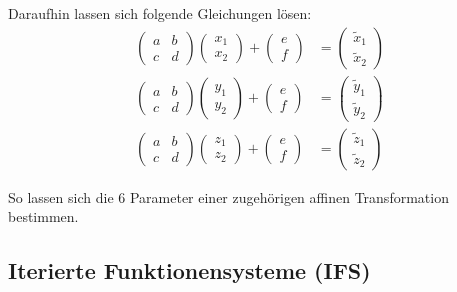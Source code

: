 \documentclass[afourpaper]{latex-classes/handout}
\begin{document}
Daraufhin lassen sich folgende Gleichungen lösen:
\begin{align*}
  \begin{pmatrix}
    a & b \\ c & d
  \end{pmatrix} \begin{pmatrix}
    x_1 \\ x_2
  \end{pmatrix} + \begin{pmatrix}
    e \\ f
  \end{pmatrix} &= \begin{pmatrix}
    \widetilde{x}_1 \\ \widetilde{x}_2
  \end{pmatrix} \\
  \begin{pmatrix}
    a & b \\ c & d
  \end{pmatrix} \begin{pmatrix}
    y_1 \\ y_2
  \end{pmatrix} + \begin{pmatrix}
    e \\ f
  \end{pmatrix} &= \begin{pmatrix}
    \widetilde{y}_1 \\ \widetilde{y}_2
  \end{pmatrix} \\
  \begin{pmatrix}
    a & b \\ c & d
  \end{pmatrix} \begin{pmatrix}
    z_1 \\ z_2
  \end{pmatrix} + \begin{pmatrix}
    e \\ f
  \end{pmatrix} &= \begin{pmatrix}
    \widetilde{z}_1 \\ \widetilde{z}_2
  \end{pmatrix}
\end{align*}

So lassen sich die 6 Parameter einer zugehörigen affinen Transformation bestimmen.

\subsection{Iterierte Funktionensysteme (IFS)}
\end{document}
